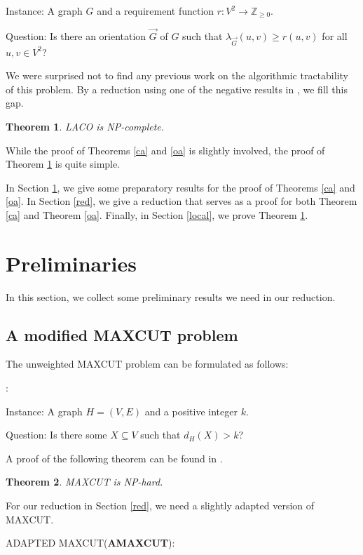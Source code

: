 \documentclass[a4paper,12pt,makeidx]{article}
\newtheorem{theo}{Theorem}
\begin{document}
\smallskip
\noindent Instance: A graph $G$ and a requirement function $r:V^2\rightarrow \mathbb{Z}_{\geq 0}$.

\smallskip
\noindent Question: Is there an orientation $\vec{G}$ of $G$ such that $\lambda_{\vec{G}}(u,v)\geq r(u,v)$ for all $u,v \in V^2$?

We were surprised not to find any previous work on the algorithmic tractability of this problem. By a reduction using one of the negative results in \cite{bikks}, we fill this gap.

\begin{theo}\label{loc}LACO is NP-complete.
\end{theo}
While the proof of Theorems \ref{ca} and \ref{oa} is slightly involved, the proof of Theorem \ref{loc} is quite simple.
\medskip

In Section \ref{prem}, we give some preparatory results for the proof of Theorems \ref{ca} and \ref{oa}. In Section \ref{red}, we give a reduction that serves as a proof for both Theorem \ref{ca} and Theorem \ref{oa}. Finally, in Section \ref{local}, we prove Theorem \ref{loc}.

\section{Preliminaries}\label{prem}
In this section, we collect some preliminary results we need in our reduction.

\subsection{A modified MAXCUT problem}

The unweighted MAXCUT problem can be formulated as follows:

\bigskip
{}:

\smallskip
\noindent Instance: A graph $H=(V,E)$ and a positive integer $k$.

\smallskip
\noindent Question: Is there some $X \subseteq V$ such that $d_H(X) > k$?
\bigskip

 A proof of the following theorem can be found in \cite{gj}.

\begin{theo}
MAXCUT is NP-hard.
\end{theo}
For our reduction in Section \ref{red}, we need a slightly adapted version of MAXCUT.

\bigskip
\noindent  ADAPTED MAXCUT({\bf AMAXCUT}):
\end{document}
